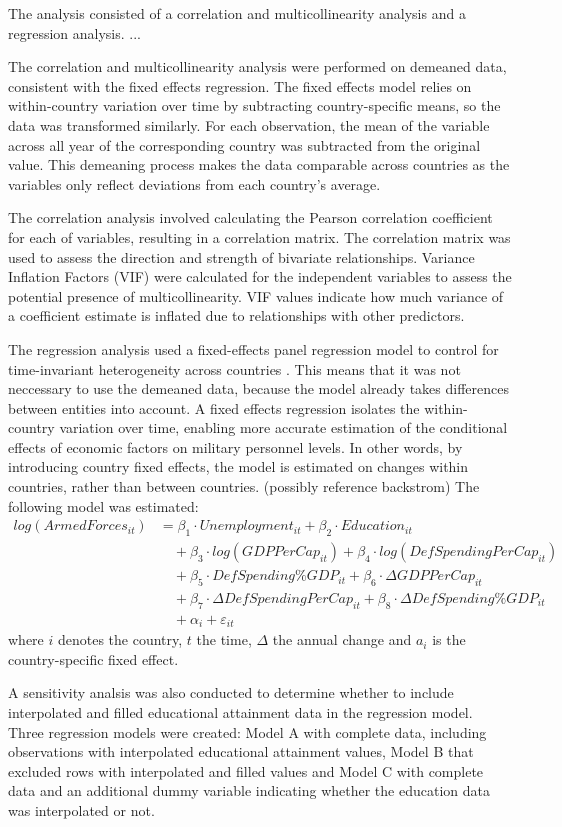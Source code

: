 The analysis consisted of a correlation and multicollinearity analysis and a regression analysis. ...

The correlation and multicollinearity analysis were performed on demeaned data, consistent 
with the fixed effects regression. The fixed effects model relies on within-country variation 
over time by subtracting country-specific means, so the data was transformed similarly. For 
each observation, the mean of the variable across all year of the corresponding country was 
subtracted from the original value. This demeaning process makes the data comparable across 
countries as the variables only reflect deviations from each country's average. 

The correlation analysis involved calculating the Pearson correlation coefficient for each 
of variables, resulting in a correlation matrix. The correlation matrix was used to assess the 
direction and strength of bivariate relationships.
Variance Inflation Factors (VIF) were calculated for the independent variables to 
assess the potential presence of multicollinearity. VIF values indicate how much variance
of a coefficient estimate is inflated due to relationships with other predictors.

The regression analysis used a fixed-effects panel regression model to control for time-invariant 
heterogeneity across countries \parencite{backstrom_are_2019}. This means that it was not 
neccessary to 
use the demeaned data, because the model already takes differences between entities into account.
A fixed effects regression isolates the within-country variation over time, enabling more accurate 
estimation of the conditional effects of economic factors on military personnel levels.
In other words, by introducing country fixed effects, the model is estimated on changes within 
countries, rather than between countries. (possibly reference backstrom) 
The following model was estimated:
\begin{align*}
log(ArmedForces_{it}) &= \beta_1 \cdot Unemployment_{it} 
+ \beta_2 \cdot Education_{it} \\
&\quad + \beta_3 \cdot log(GDPPerCap_{it}) 
+ \beta_4 \cdot log(DefSpendingPerCap_{it}) \\
&\quad + \beta_5 \cdot DefSpending\%GDP_{it} 
+ \beta_6 \cdot \Delta GDPPerCap_{it} \\
&\quad + \beta_7 \cdot \Delta DefSpendingPerCap_{it} 
+ \beta_8 \cdot \Delta DefSpending\%GDP_{it} \\
&\quad + \alpha_i + \varepsilon_{it}
\end{align*}
where $i$ denotes the country, $t$ the time, $\Delta$ the annual change and 
$a_i$ is the country-specific fixed effect.

A sensitivity analsis was also conducted to determine whether to include interpolated and filled educational 
attainment data in the regression model. Three regression models were created: Model A with 
complete data, including observations with interpolated educational attainment values, Model B 
that excluded rows with interpolated and filled values and Model C with complete data and an additional 
dummy variable indicating whether the education data was interpolated or not.